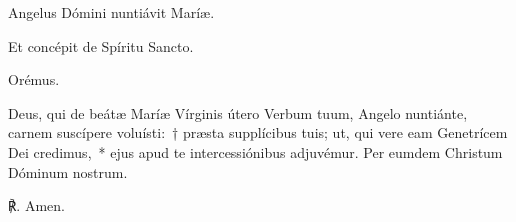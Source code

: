 
\noindent \vv Angelus Dómini nuntiávit Maríæ.

\noindent \rr Et concépit de Spíritu Sancto.


%
%

Orémus.

\noindent Deus, qui de beátæ Maríæ Vírginis útero Verbum tuum, Angelo nuntiánte, carnem suscípere voluísti:~† præsta supplícibus tuis; ut, qui vere eam Genetrícem Dei credimus,~* ejus apud te intercessiónibus adjuvémur. Per eumdem Christum Dóminum nostrum.

℟. Amen.